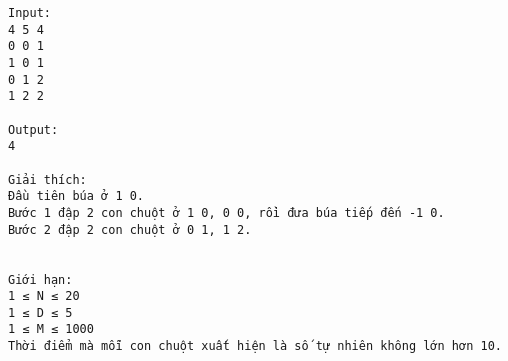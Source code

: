 \begin{verbatim}
Input:
4 5 4
0 0 1
1 0 1
0 1 2
1 2 2

Output:
4

Giải thích:
Đầu tiên búa ở 1 0.
Bước 1 đập 2 con chuột ở 1 0, 0 0, rồi đưa búa tiếp đến -1 0.
Bước 2 đập 2 con chuột ở 0 1, 1 2.


Giới hạn:
1 ≤ N ≤ 20
1 ≤ D ≤ 5
1 ≤ M ≤ 1000
Thời điểm mà mỗi con chuột xuất hiện là số tự nhiên không lớn hơn 10.
\end{verbatim}